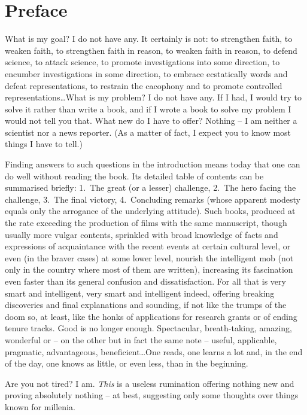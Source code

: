 \chapter*{Preface} 
%
What is my goal? I do not have any. It certainly is not: to strengthen faith, to
weaken faith, to strengthen faith in reason, to weaken faith in reason, to
defend science, to attack science, to promote investigations into some
direction, to encumber investigations in some direction, to embrace ecstatically
words and defeat representations, to restrain the cacophony and to promote
controlled representations\ldots What is my problem? I do not have any.
If I had, I would try to solve it rather than write a book, and if I wrote a
book to solve my problem I would not tell you that. What new do I have to offer?
Nothing -- I am neither a scientist nor a news reporter. (As a matter of fact, I
expect you to know most things I have to tell.)

Finding answers to such questions in the introduction means today that one can
do well without reading the book. Its detailed table of contents can be
summarised briefly: 1.~The great (or a lesser) challenge, 2.~The hero facing the
challenge,  
3.~The final victory, 4.~Concluding remarks (whose apparent
modesty equals only the arrogance of the underlying attitude). Such books,
produced at the rate exceeding the production of films with the same manuscript, 
though usually more vulgar contents,
sprinkled with broad knowledge of facts and expressions of acquaintance
with the recent events at certain cultural level, or even (in the braver cases)
at some lower level, nourish 
the intelligent mob (not only in the country where most of them are
written), increasing its fascination even faster than its general confusion
and dissatisfaction. For all that is very smart and intelligent, very smart and
intelligent indeed, offering breaking discoveries and final explanations and
sounding, if not like the trumps of the doom so, at least, like the honks of
applications for research grants or of ending tenure tracks. Good is no longer
enough. Spectacular, breath-taking, amazing, wonderful or -- on the other but in
fact the same note -- useful, applicable, pragmatic, advantageous,
beneficient\ldots One reads, one learns a lot and, in the end of the day, one knows as
little, or even less, than in the beginning. 

Are you not tired? I am. {\em This} is a useless rumination offering nothing new
and proving absolutely nothing -- at best, suggesting only some thoughts over
things known for millenia.  

